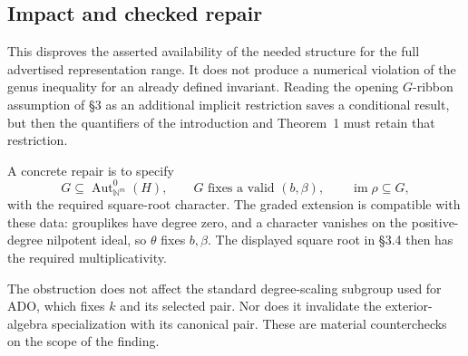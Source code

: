 \documentclass[10pt]{article}
\begin{document}
\subsection*{Impact and checked repair}
This disproves the asserted availability of the needed structure for the full advertised representation range. It does not produce a numerical violation of the genus inequality for an already defined invariant. Reading the opening \(G\)-ribbon assumption of §3 as an additional implicit restriction saves a conditional result, but then the quantifiers of the introduction and Theorem 1 must retain that restriction.\par
A concrete repair is to specify \[G\subseteq\operatorname{Aut}^0_{\mathbb N^m}(H),\qquad
 G\text{ fixes a valid }(b,\beta),\qquad \operatorname{im}\rho\subseteq G,
 \tag{4}\] with the required square-root character. The graded extension is compatible with these data: grouplikes have degree zero, and a character vanishes on the positive-degree nilpotent ideal, so \(\theta\) fixes \(b,\beta\). The displayed square root in §3.4 then has the required multiplicativity.\par
The obstruction does not affect the standard degree-scaling subgroup used for ADO, which fixes \(k\) and its selected pair. Nor does it invalidate the exterior-algebra specialization with its canonical pair. These are material counterchecks on the scope of the finding.\par
\end{document}
